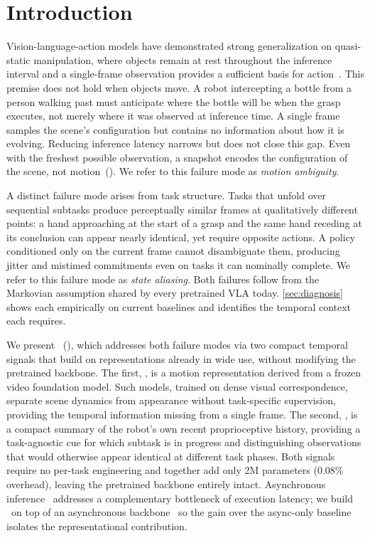 
\section{Introduction}
\label{sec:introduction}
Vision-language-action models have demonstrated strong generalization on quasi-static manipulation, where objects remain at rest throughout the inference interval and a single-frame observation provides a sufficient basis for action~\cite{pi0, pi05, openvla}. This premise does not hold when objects move. A robot intercepting a bottle from a person walking past must anticipate where the bottle will be when the grasp executes, not merely where it was observed at inference time. A single frame samples the scene's configuration but contains no information about how it is evolving. Reducing inference latency narrows but does not close this gap. Even with the freshest possible observation, a snapshot encodes the configuration of the scene, not motion~(). We refer to this failure mode as \emph{motion ambiguity}.

A distinct failure mode arises from task structure. Tasks that unfold over sequential subtasks produce perceptually similar frames at qualitatively different points: a hand approaching at the start of a grasp and the same hand receding at its conclusion can appear nearly identical, yet require opposite actions. A policy conditioned only on the current frame cannot disambiguate them, producing jitter and mistimed commitments even on tasks it can nominally complete. We refer to this failure mode as \emph{state aliasing}. Both failures follow from the Markovian assumption shared by every pretrained VLA today. \cref{sec:diagnosis} shows each empirically on current baselines and identifies the temporal context each requires.

We present \ours~(), which addresses both failure modes via two compact temporal signals that build on representations already in wide use, without modifying the pretrained backbone. The first, \TEMPOMOT, is a motion representation derived from a frozen video foundation model. Such models, trained on dense visual correspondence, separate scene dynamics from appearance without task-specific supervision, providing the temporal information missing from a single frame. The second, \TEMPOACT, is a compact summary of the robot's own recent proprioceptive history, providing a task-agnostic cue for which subtask is in progress and distinguishing observations that would otherwise appear identical at different task phases. Both signals require no per-task engineering and together add only 2M parameters (0.08\% overhead), leaving the pretrained backbone entirely intact. Asynchronous inference~\cite{rtc, vlash} addresses a complementary bottleneck of execution latency; we build \ours\ on top of an asynchronous backbone~\cite{vlash} so the gain over the async-only baseline isolates the representational contribution.

